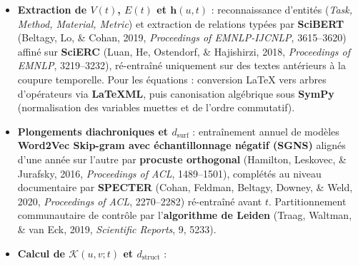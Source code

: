 \documentclass[a4paper,11pt]{article}
\providecommand{\tightlist}{\setlength{\itemsep}{0pt}\setlength{\parskip}{0pt}}
\begin{document}
\begin{itemize}
\tightlist
\item
  \textbf{Extraction de \(V(t)\), \(E(t)\) et \(\mathbf{h}(u,t)\)} :
  reconnaissance d'entités (\emph{Task, Method, Material, Metric}) et
  extraction de relations typées par \textbf{SciBERT} (Beltagy, Lo, \&
  Cohan, 2019, \emph{Proceedings of EMNLP-IJCNLP}, 3615--3620) affiné
  sur \textbf{SciERC} (Luan, He, Ostendorf, \& Hajishirzi, 2018,
  \emph{Proceedings of EMNLP}, 3219--3232), ré-entraîné uniquement sur
  des textes antérieurs à la coupure temporelle. Pour les équations :
  conversion LaTeX vers arbres d'opérateurs via \textbf{LaTeXML}, puis
  canonisation algébrique sous \textbf{SymPy} (normalisation des
  variables muettes et de l'ordre commutatif).
\item
  \textbf{Plongements diachroniques et \(d_{\text{surf}}\)} :
  entraînement annuel de modèles \textbf{Word2Vec Skip-gram avec
  échantillonnage négatif (SGNS)} alignés d'une année sur l'autre par
  \textbf{procuste orthogonal} (Hamilton, Leskovec, \& Jurafsky, 2016,
  \emph{Proceedings of ACL}, 1489--1501), complétés au niveau
  documentaire par \textbf{SPECTER} (Cohan, Feldman, Beltagy, Downey, \&
  Weld, 2020, \emph{Proceedings of ACL}, 2270--2282) ré-entraîné avant
  \(t\). Partitionnement communautaire de contrôle par
  l'\textbf{algorithme de Leiden} (Traag, Waltman, \& van Eck, 2019,
  \emph{Scientific Reports}, 9, 5233).
\item
  \textbf{Calcul de \(\mathcal{K}(u,v;t)\) et \(d_{\text{struct}}\)} :


\end{itemize}
\end{document}
